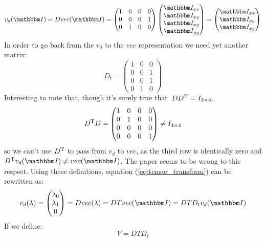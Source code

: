 \documentclass[a4paper,11pt]{article}
\newcommand{\itm}{\mathbbm I}
\newcommand{\itc}[1]{\itm_{#1}}
\begin{document}
\begin{equation}
  v_d(\itm) = D vec(\itm) =
  \begin{pmatrix}
    1 & 0 & 0 & 0\\
    0 & 0 & 0 & 1\\
    0 & 1 & 0 & 0
  \end{pmatrix}
  \begin{pmatrix}
    \itc{xx}\\
    \itc{xy}\\
    \itc{xy}\\
    \itc{yy}
  \end{pmatrix} = 
  \begin{pmatrix}
    \itc{xx}\\
    \itc{yy}\\
    \itc{xy}
  \end{pmatrix}
\end{equation}
In order to go back from the $v_d$ to the $vec$ representation we need
yet another matrix:
\begin{equation}
  D_t = 
  \begin{pmatrix}
    1 & 0 & 0\\
    0 & 0 & 1\\
    0 & 0 & 1\\
    0 & 1 & 0
  \end{pmatrix}
\end{equation}
Interesting to note that, though it's surely true that\
$DD^{\rm T} = I_{3\times3}$,
$$
D^{\rm T}D = 
\begin{pmatrix}
  1 & 0 & 0 & 0\\
  0 & 1 & 0 & 0\\
  0 & 0 & 0 & 0\\
  0 & 0 & 0 & 1
\end{pmatrix}
\neq I_{4\times4}
$$
so we can't use $D^{\rm T}$ to pass from $v_d$ to $vec$, as the third row is
identically zero and $D^{\rm T}v_d(\itm) \neq vec(\itm)$.
The paper \cite{errors} seems to be wrong to this respect.
Using these definitions, equation (\ref{eq:tensor_transform}) can be rewritten
as:
\begin{equation}
  v_d(\lambda) =
  \begin{pmatrix}
    \lambda_0\\
    \lambda_1\\
    0
  \end{pmatrix} =
  D vec(\lambda) = DT vec(\itm) = DTD_t v_d(\itm)
\end{equation}
If we define:
\begin{equation}
  V = DTD_t
\end{equation}
\end{document}
